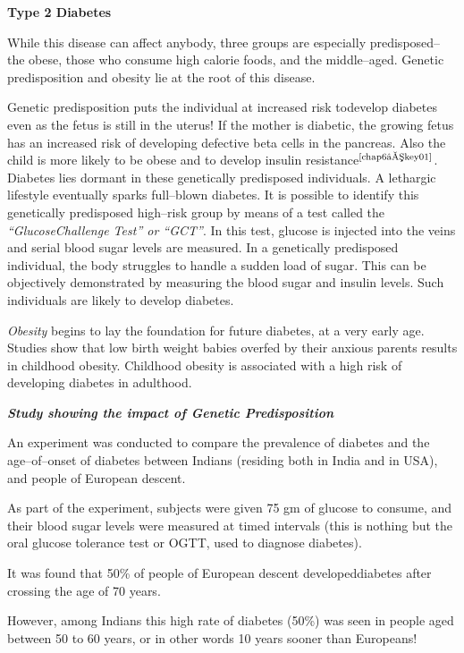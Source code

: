 \noindent
\textbf{Type 2 Diabetes}

While this disease can affect anybody, three groups are especially predisposed– the obese, those who consume high calorie foods, and the middle–aged. Genetic predisposition and obesity lie at the root of this disease.

Genetic predisposition puts the individual at increased risk to\break develop diabetes even as the fetus is still in the uterus! If the mother is diabetic, the growing fetus has an increased risk of developing defe\-ctive beta cells in the pancreas. Also the child is more likely to be obese and to develop insulin resistance$^{\text{\cite{chap6–key01}}}$. Diabetes lies dormant in these genetically predisposed individuals. A lethargic lifestyle eve\-ntually sparks full–blown diabetes. It is possible to identify this genetically predisposed high–risk group by means of a test called the \textit{“Glucose\break Challenge Test” or “GCT”}. In this test, glucose is injected into the veins and serial blood sugar levels are measured. In a genetically predisposed individual, the body struggles to handle a sudden load of sugar. This can be objectively demonstrated by measuring the blood sugar and insulin levels. Such individuals are likely to develop diabetes.

\textit{Obesity} begins to lay the foundation for future diabetes, at a very early age. Studies show that low birth weight babies overfed by their anxious parents results in childhood obesity. Childhood obesity is asso\-ciated with a high risk of developing diabetes in adulthood.

\noindent
\textbf{\textit{Study showing the impact of Genetic Predisposition}}

An experiment was conducted to compare the prevalence of diabetes and the age–of–onset of diabetes between Indians (residing both in India and in USA), and people of European descent.

As part of the experiment, subjects were given 75 gm of glucose to consume, and their blood sugar levels were measured at timed intervals (this is nothing but the oral glucose tolerance test or OGTT, used to diagnose diabetes).

It was found that 50\% of people of European descent developed\break diabetes after crossing the age of 70 years.

However, among Indians this high rate of diabetes (50\%) was seen in people aged between 50 to 60 years, or in other words 10 years sooner than Europeans!

